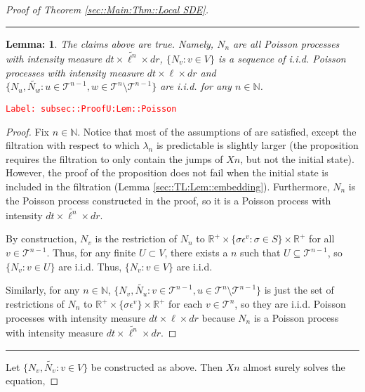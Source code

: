 \documentclass[12pt]{article}
\newcommand{\mb}{\mathbb}
\newcommand{\mc}{\mathcal}
\newcommand{\ep}{\epsilon}
\newcommand{\tr}{\textcolor{red}}
\newcommand{\labe}[1]{\tr{\texttt{Label: #1}}}
\newcommand{\ind}{\hspace{24pt}}
\newcommand{\lin}{\rule{\linewidth}{0.4 pt}}
\renewcommand{\v}{v}							%
\newcommand{\vv}{u}								%
\newcommand{\vvv}{w}							%
\renewcommand{\U}{U}							%
\renewcommand{\S}{S}							%
\newcommand{\s}{\sigma}							%
\newcommand{\ev}[1]{\ep^{#1}}					%
\renewcommand{\t}{t}							%
\newcommand{\X}{X}								%
\newcommand{\poiss}[1]{N_{#1}}						%
\newcommand{\pup}[1]{^{#1}}							%
\newcommand{\tree}{\mc{T}}							%
\renewcommand{\r}{r}								%
\newcommand{\numb}{n}								%
\newcommand{\rate}[1]{\lambda_{#1}}					%
\newcommand{\Sm}{\ell}								%
\newcommand{\alt}{\widetilde}						%
\newtheorem{lem}[thms]{Lemma: }
\begin{document}
\begin{proof}[Proof of Theorem \ref{sec::Main:Thm::Local SDE}]
\lin

\begin{lem}
The claims above are true. Namely, \(\poiss{\numb}\) are all Poisson processes with intensity measure \(d\t\times\alt{\Sm^{\numb}}\times d\r\), \(\{\poiss{\v}:\v\in V\}\) is a sequence of i.i.d. Poisson processes with intensity measure \(d\t\times\Sm\times d\r\) and \(\{\poiss{\vv},\alt{\poiss{\vvv}}:\vv\in \tree\pup{\numb-1},\vvv\in\tree\pup{\numb}\setminus\tree\pup{\numb-1}\}\) are i.i.d. for any \(\numb \in \mb{N}\).

\label{subsec::ProofU:Lem::Poisson}
\end{lem}
\labe{subsec::ProofU:Lem::Poisson}
\begin{proof}

Fix \(\numb \in \mb{N}\). Notice that most of the assumptions of \cite[Proposition 14.7.I(b)]{DalVer08} are satisfied, except the filtration with respect to which \(\rate{\numb}\) is predictable is slightly larger (the proposition requires the filtration to only contain the jumps of \(\X{}{}{\numb}\), but not the initial state). However, the proof of the proposition does not fail when the initial state is included in the filtration (Lemma \ref{sec::TL:Lem::embedding}). Furthermore, \(\poiss{\numb}\) is the Poisson process constructed in the proof, so it is a Poisson process with intensity \(d\t\times \alt{\Sm^\numb}\times d\r\).

\ind By construction, \(\poiss{\v}\) is the restriction of \(\poiss{\numb}\) to \(\mb{R}^+ \times \{\s\ev{\v}: \s\in \S\}\times \mb{R}^+\) for all \(\v\in \tree\pup{\numb-1}\). Thus, for any finite \(\U \subset  V\), there exists a \(\numb\) such that \(\U \subseteq \tree\pup{\numb-1}\), so \(\{\poiss{\v}: \v\in \U\}\) are i.i.d. Thus, \(\{\poiss{\v}: \v\in  V\}\) are i.i.d.

\ind Similarly, for any \(\numb \in \mb{N}\), \(\{\poiss{\v},\alt{\poiss{\vv}}: \v \in \tree\pup{\numb-1},\vv\in\tree\pup{\numb}\setminus\tree\pup{\numb-1}\}\) is just the set of restrictions of \(\poiss{\numb}\) to \(\mb{R}^+\times\{\s\ev{\v}\}\times\mb{R}^+\) for each \(\v\in \tree\pup{\numb}\), so they are i.i.d. Poisson processes with intensity measure \(d\t\times \Sm\times d\r\) because \(\poiss{\numb}\) is a Poisson process with intensity measure \(d\t\times\alt{\Sm^\numb}\times d\r\).
\end{proof}

\lin

Let \(\{\poiss{\v},\alt{\poiss{\v}}:\v\in V\}\) be constructed as above. Then \(\X{}{}{\numb}\) almost surely solves the equation,


\end{proof}
\end{document}
